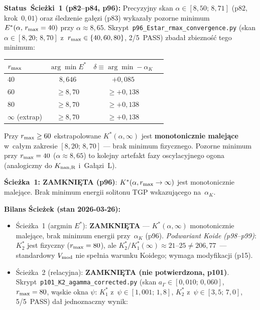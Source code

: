 \begin{problem}
\medskip
\textbf{Status~\'Scie\.zki~1 (p82--p84, p96):}
Precyzyjny skan $\alpha\in[8{,}50;\,8{,}71]$ (p82, krok~$0{,}01$)
oraz \'sledzenie ga\l{}\k{e}zi (p83) wykaza\l{}y pozorne minimum
$E^*(\alpha,\, r_{\rm max}=40)$ przy $\alpha\approx 8{,}65$.
Skrypt~\texttt{p96\_Estar\_rmax\_convergence.py} (skan $\alpha\in[8{,}20;\,8{,}70]$
z~$r_{\rm max}\in\{40,60,80\}$, 2/5~PASS) zbada\l{} zbiezno\'s\'c tego minimum:
\begin{center}\small
\begin{tabular}{@{}lccc@{}}
\toprule
$r_{\rm max}$ & $\arg\min E^*$ & $\delta\!\equiv\!\arg\min-\alpha_K$ \\
\midrule
$40$ & $8{,}646$ & $+0{,}085$ \\
$60$ & $\geq 8{,}70$ & $\geq +0{,}138$ \\
$80$ & $\geq 8{,}70$ & $\geq +0{,}138$ \\
$\infty$ (extrap) & $\geq 8{,}70$ & $\geq +0{,}138$ \\
\bottomrule
\end{tabular}
\end{center}
Przy $r_{\rm max}\geq 60$ ekstrapolowane $K^*(\alpha,\infty)$ jest
\textbf{monotonicznie malej\k{a}ce} w~ca\l{}ym zakresie $[8{,}20;\,8{,}70]$
--- brak minimum fizycznego.
Pozorne minimum przy $r_{\rm max}=40$ ($\alpha\approx 8{,}65$) to kolejny
artefakt fazy oscylacyjnego ogona (analogiczny do $K_{\rm nan,R}$ i~Ga\l{}\k{a}zi~L).

\textbf{\'Scie\.zka~1: ZAMKNI\k{E}TA (p96)}:
$K^*(\alpha,r_{\rm max}\to\infty)$ jest monotonicznie malej\k{a}ce.
Brak minimum energii solitonu TGP wskazuj\k{a}cego na~$\alpha_K$.

\medskip
\textbf{Bilans \'Scie\.zek (stan 2026-03-26):}
\begin{itemize}[nosep]
  \item \'Scie\.zka~1 (argmin $E^*$): \textbf{ZAMKNI\k{E}TA} --- $K^*(\alpha,\infty)$
    monotonicznie malej\k{a}ce, brak minimum energii przy~$\alpha_K$ (p96).
    \emph{Podwariant Koide (p98--p99)}: $K^*_2$ jest fizyczny ($r_{\rm max}=80$),
    ale $K^*_2/K^*_1(\infty)\approx21$--$25 \neq 206{,}77$~---
    standardowy $V_{\rm mod}$ nie spe\l{}nia warunku Koidego;
    wymaga modyfikacji (p15).
  \item \'Scie\.zka~2 (relacyjna): \textbf{ZAMKNI\k{E}TA (nie potwierdzona, p101)}.
    Skrypt~\texttt{p101\_K2\_agamma\_corrected.py}
    (skan $a_\Gamma\in[0{,}010;\,0{,}060]$, $r_{\rm max}=80$,
    w\k{a}skie okna $\psi$:
    $K^*_1$ z~$\psi\in[1{,}001;\,1{,}8]$, $K^*_2$ z~$\psi\in[3{,}5;\,7{,}0]$,
    5/5~PASS) da\l{} jednoznaczny wynik:


\end{itemize}
\end{problem}
